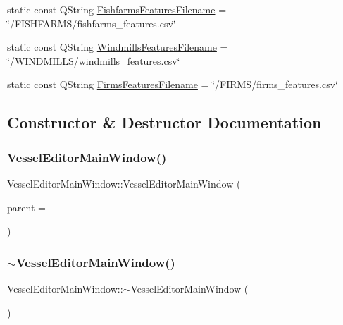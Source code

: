 \begin{DoxyCompactItemize}
\item 
static const Q\+String \mbox{\hyperlink{class_vessel_editor_main_window_ad03df0094d3b6d170f556b4bbfdbc160}{Fishfarms\+Features\+Filename}} = \char`\"{}/F\+I\+S\+H\+F\+A\+R\+MS/fishfarms\+\_\+features.\+csv\char`\"{}
\item 
static const Q\+String \mbox{\hyperlink{class_vessel_editor_main_window_aef91541f29a6109b2e43c950e5c13cce}{Windmills\+Features\+Filename}} = \char`\"{}/W\+I\+N\+D\+M\+I\+L\+LS/windmills\+\_\+features.\+csv\char`\"{}
\item 
static const Q\+String \mbox{\hyperlink{class_vessel_editor_main_window_a150405cad4b001cb02d5bf5a8b4a3487}{Firms\+Features\+Filename}} = \char`\"{}/F\+I\+R\+MS/firms\+\_\+features.\+csv\char`\"{}
\end{DoxyCompactItemize}


\subsection{Constructor \& Destructor Documentation}
\mbox{\label{class_vessel_editor_main_window_a834ff8a49a787123972e90821875ec0e}} 
\subsubsection{\texorpdfstring{VesselEditorMainWindow()}{VesselEditorMainWindow()}}
{\footnotesize\ttfamily Vessel\+Editor\+Main\+Window\+::\+Vessel\+Editor\+Main\+Window (\begin{DoxyParamCaption}\item[{Q\+Widget $\ast$}]{parent = {} }\end{DoxyParamCaption})\hspace{0.3cm}{\ttfamily [explicit]}}

\mbox{\label{class_vessel_editor_main_window_a6c3a243f206a75aac9474890137f79e9}} 
\subsubsection{\texorpdfstring{$\sim$VesselEditorMainWindow()}{~VesselEditorMainWindow()}}
{\footnotesize\ttfamily Vessel\+Editor\+Main\+Window\+::$\sim$\+Vessel\+Editor\+Main\+Window (\begin{DoxyParamCaption}{ }\end{DoxyParamCaption})}



